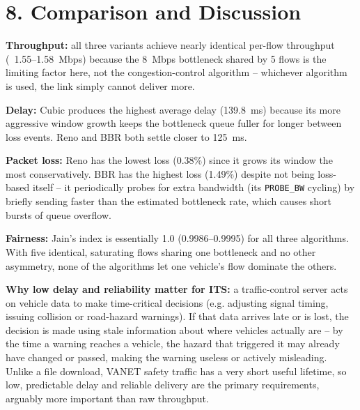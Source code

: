 \documentclass[11pt]{article}
\begin{document}
\section*{8. Comparison and Discussion}
\textbf{Throughput:} all three variants achieve nearly identical per-flow
throughput (~1.55--1.58~Mbps) because the 8~Mbps bottleneck shared by 5 flows
is the limiting factor here, not the congestion-control algorithm --
whichever algorithm is used, the link simply cannot deliver more.

\textbf{Delay:} Cubic produces the highest average delay (139.8~ms) because
its more aggressive window growth keeps the bottleneck queue fuller for
longer between loss events. Reno and BBR both settle closer to 125~ms.

\textbf{Packet loss:} Reno has the lowest loss (0.38\%) since it grows its
window the most conservatively. BBR has the highest loss (1.49\%) despite not
being loss-based itself -- it periodically probes for extra bandwidth
(its \texttt{PROBE\_BW} cycling) by briefly sending faster than the estimated
bottleneck rate, which causes short bursts of queue overflow.

\textbf{Fairness:} Jain's index is essentially 1.0 (0.9986--0.9995) for all
three algorithms. With five identical, saturating flows sharing one
bottleneck and no other asymmetry, none of the algorithms let one vehicle's
flow dominate the others.

\textbf{Why low delay and reliability matter for ITS:} a traffic-control
server acts on vehicle data to make time-critical decisions (e.g. adjusting
signal timing, issuing collision or road-hazard warnings). If that data
arrives late or is lost, the decision is made using stale information about
where vehicles actually are -- by the time a warning reaches a vehicle, the
hazard that triggered it may already have changed or passed, making the
warning useless or actively misleading. Unlike a file download, VANET safety
traffic has a very short useful lifetime, so low, predictable delay and
reliable delivery are the primary requirements, arguably more important than
raw throughput.
\end{document}
